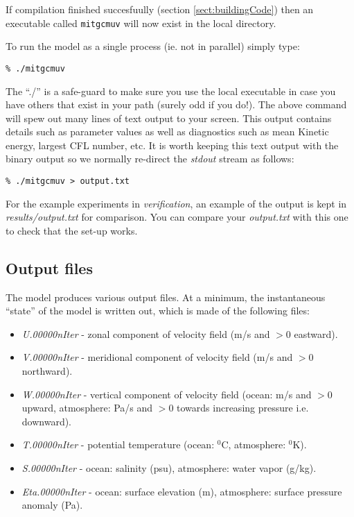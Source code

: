 If compilation finished succesfuully (section \ref{sect:buildingCode})
then an executable called \texttt{mitgcmuv} will now exist in the
local directory.

To run the model as a single process (ie. not in parallel) simply
type:
\begin{verbatim}
% ./mitgcmuv
\end{verbatim}
The ``./'' is a safe-guard to make sure you use the local executable
in case you have others that exist in your path (surely odd if you
do!). The above command will spew out many lines of text output to
your screen.  This output contains details such as parameter values as
well as diagnostics such as mean Kinetic energy, largest CFL number,
etc. It is worth keeping this text output with the binary output so we
normally re-direct the {\em stdout} stream as follows:
\begin{verbatim}
% ./mitgcmuv > output.txt
\end{verbatim}

For the example experiments in {\em verification}, an example of the
output is kept in {\em results/output.txt} for comparison. You can compare
your {\em output.txt} with this one to check that the set-up works.



\subsection{Output files}

The model produces various output files. At a minimum, the instantaneous
``state'' of the model is written out, which is made of the following files:

\begin{itemize}
\item \textit{U.00000nIter} - zonal component of velocity field (m/s and $>
0 $ eastward).

\item \textit{V.00000nIter} - meridional component of velocity field (m/s
and $> 0$ northward).

\item \textit{W.00000nIter} - vertical component of velocity field (ocean:
m/s and $> 0$ upward, atmosphere: Pa/s and $> 0$ towards increasing pressure
i.e. downward).

\item \textit{T.00000nIter} - potential temperature (ocean: $^{0}$C,
atmosphere: $^{0}$K).

\item \textit{S.00000nIter} - ocean: salinity (psu), atmosphere: water vapor
(g/kg).

\item \textit{Eta.00000nIter} - ocean: surface elevation (m), atmosphere:
surface pressure anomaly (Pa).
\end{itemize}

